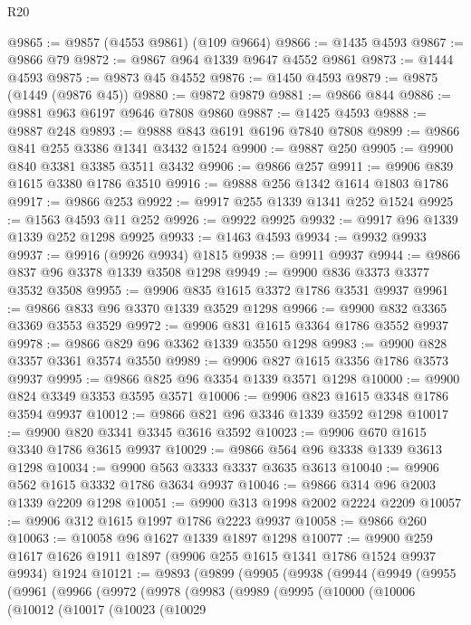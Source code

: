 \begin{lexlean}{R20}
\begin{coremodule}
@9865 := @9857 (@4553 @9861) (@109 @9664)
@9866 := @1435 @4593
@9867 := @9866 @79
@9872 := @9867 @964 @1339 @9647 @4552 @9861
@9873 := @1444 @4593
@9875 := @9873 @45 @4552
@9876 := @1450 @4593
@9879 := @9875 (@1449 (@9876 @45))
@9880 := @9872 @9879
@9881 := @9866 @844
@9886 := @9881 @963 @6197 @9646 @7808 @9860
@9887 := @1425 @4593
@9888 := @9887 @248
@9893 := @9888 @843 @6191 @6196 @7840 @7808
@9899 := @9866 @841 @255 @3386 @1341 @3432 @1524
@9900 := @9887 @250
@9905 := @9900 @840 @3381 @3385 @3511 @3432
@9906 := @9866 @257
@9911 := @9906 @839 @1615 @3380 @1786 @3510
@9916 := @9888 @256 @1342 @1614 @1803 @1786
@9917 := @9866 @253
@9922 := @9917 @255 @1339 @1341 @252 @1524
@9925 := @1563 @4593 @11 @252
@9926 := @9922 @9925
@9932 := @9917 @96 @1339 @1339 @252 @1298 @9925
@9933 := @1463 @4593
@9934 := @9932 @9933
@9937 := @9916 (@9926 @9934) @1815
@9938 := @9911 @9937
@9944 := @9866 @837 @96 @3378 @1339 @3508 @1298
@9949 := @9900 @836 @3373 @3377 @3532 @3508
@9955 := @9906 @835 @1615 @3372 @1786 @3531 @9937
@9961 := @9866 @833 @96 @3370 @1339 @3529 @1298
@9966 := @9900 @832 @3365 @3369 @3553 @3529
@9972 := @9906 @831 @1615 @3364 @1786 @3552 @9937
@9978 := @9866 @829 @96 @3362 @1339 @3550 @1298
@9983 := @9900 @828 @3357 @3361 @3574 @3550
@9989 := @9906 @827 @1615 @3356 @1786 @3573 @9937
@9995 := @9866 @825 @96 @3354 @1339 @3571 @1298
@10000 := @9900 @824 @3349 @3353 @3595 @3571
@10006 := @9906 @823 @1615 @3348 @1786 @3594 @9937
@10012 := @9866 @821 @96 @3346 @1339 @3592 @1298
@10017 := @9900 @820 @3341 @3345 @3616 @3592
@10023 := @9906 @670 @1615 @3340 @1786 @3615 @9937
@10029 := @9866 @564 @96 @3338 @1339 @3613 @1298
@10034 := @9900 @563 @3333 @3337 @3635 @3613
@10040 := @9906 @562 @1615 @3332 @1786 @3634 @9937
@10046 := @9866 @314 @96 @2003 @1339 @2209 @1298
@10051 := @9900 @313 @1998 @2002 @2224 @2209
@10057 := @9906 @312 @1615 @1997 @1786 @2223 @9937
@10058 := @9866 @260
@10063 := @10058 @96 @1627 @1339 @1897 @1298
@10077 := @9900 @259 @1617 @1626 @1911 @1897 (@9906 @255 @1615 @1341 @1786 @1524 @9937 @9934) @1924
@10121 := @9893
    (@9899
      (@9905
        (@9938
          (@9944
            (@9949
              (@9955
                (@9961
                  (@9966
                    (@9972
                      (@9978
                        (@9983
                          (@9989
                            (@9995
                              (@10000
                                (@10006
                                  (@10012
                                    (@10017
                                      (@10023
                                        (@10029

\end{coremodule}
\end{lexlean}
